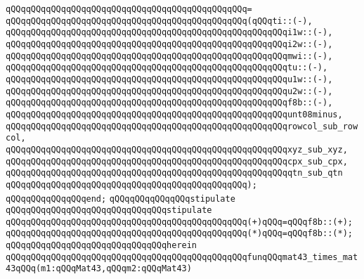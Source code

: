 \verb|qQQqqQQqqQQqqQQqqQQqqQQqqQQqqQQqqQQqqQQqqQQqqQQq=|\newline
\verb|qQQqqQQqqQQqqQQqqQQqqQQqqQQqqQQqqQQqqQQqqQQqqQQq(qQQqti::(-),|\newline
\verb|qQQqqQQqqQQqqQQqqQQqqQQqqQQqqQQqqQQqqQQqqQQqqQQqqQQqqQQqi1w::(-),|\newline
\verb|qQQqqQQqqQQqqQQqqQQqqQQqqQQqqQQqqQQqqQQqqQQqqQQqqQQqqQQqi2w::(-),|\newline
\verb|qQQqqQQqqQQqqQQqqQQqqQQqqQQqqQQqqQQqqQQqqQQqqQQqqQQqqQQqmwi::(-),|\newline
\verb|qQQqqQQqqQQqqQQqqQQqqQQqqQQqqQQqqQQqqQQqqQQqqQQqqQQqqQQqtu::(-),|\newline
\verb|qQQqqQQqqQQqqQQqqQQqqQQqqQQqqQQqqQQqqQQqqQQqqQQqqQQqqQQqu1w::(-),|\newline
\verb|qQQqqQQqqQQqqQQqqQQqqQQqqQQqqQQqqQQqqQQqqQQqqQQqqQQqqQQqu2w::(-),|\newline
\verb|qQQqqQQqqQQqqQQqqQQqqQQqqQQqqQQqqQQqqQQqqQQqqQQqqQQqqQQqf8b::(-),|\newline
\verb|qQQqqQQqqQQqqQQqqQQqqQQqqQQqqQQqqQQqqQQqqQQqqQQqqQQqqQQqunt08minus,|\newline
\verb|qQQqqQQqqQQqqQQqqQQqqQQqqQQqqQQqqQQqqQQqqQQqqQQqqQQqqQQqrowcol_sub_rowcol,|\newline
\verb|qQQqqQQqqQQqqQQqqQQqqQQqqQQqqQQqqQQqqQQqqQQqqQQqqQQqqQQqxyz_sub_xyz,|\newline
\verb|qQQqqQQqqQQqqQQqqQQqqQQqqQQqqQQqqQQqqQQqqQQqqQQqqQQqqQQqcpx_sub_cpx,|\newline
\verb|qQQqqQQqqQQqqQQqqQQqqQQqqQQqqQQqqQQqqQQqqQQqqQQqqQQqqQQqqtn_sub_qtn|\newline
\verb|qQQqqQQqqQQqqQQqqQQqqQQqqQQqqQQqqQQqqQQqqQQqqQQq);|\newline
\verb|qQQqqQQqqQQqqQQqend;|\newline
\newline
\verb|qQQqqQQqqQQqqQQqstipulate|\newline
\verb|qQQqqQQqqQQqqQQqqQQqqQQqqQQqqQQqstipulate|\newline
\verb|qQQqqQQqqQQqqQQqqQQqqQQqqQQqqQQqqQQqqQQqqQQqqQQq(+)qQQq=qQQqf8b::(+);|\newline
\verb|qQQqqQQqqQQqqQQqqQQqqQQqqQQqqQQqqQQqqQQqqQQqqQQq(*)qQQq=qQQqf8b::(*);|\newline
\verb|qQQqqQQqqQQqqQQqqQQqqQQqqQQqqQQqherein|\newline
\verb|qQQqqQQqqQQqqQQqqQQqqQQqqQQqqQQqqQQqqQQqqQQqqQQqfunqQQqmat43_times_mat43qQQq(m1:qQQqMat43,qQQqm2:qQQqMat43)|\newline

